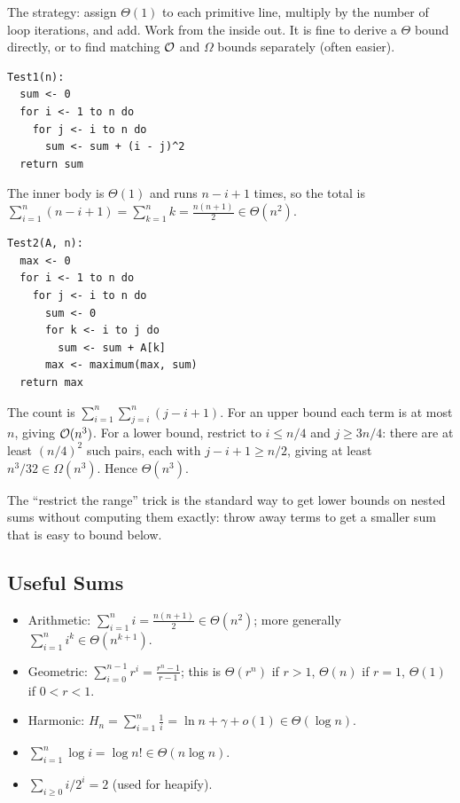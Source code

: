 The strategy: assign $\Theta(1)$ to each primitive line, multiply by the number
of loop iterations, and add. Work from the inside out. It is fine to derive a
$\Theta$ bound directly, or to find matching $\mathcal{O}$ and $\Omega$ bounds
separately (often easier).

\begin{lstlisting}
Test1(n):
  sum <- 0
  for i <- 1 to n do
    for j <- i to n do
      sum <- sum + (i - j)^2
  return sum
\end{lstlisting}

The inner body is $\Theta(1)$ and runs $n - i + 1$ times, so the total is
$\sum_{i=1}^{n} (n - i + 1) = \sum_{k=1}^{n} k = \frac{n(n+1)}{2} \in \Theta(n^2)$.

\begin{lstlisting}
Test2(A, n):
  max <- 0
  for i <- 1 to n do
    for j <- i to n do
      sum <- 0
      for k <- i to j do
        sum <- sum + A[k]
      max <- maximum(max, sum)
  return max
\end{lstlisting}

The count is $\sum_{i=1}^n \sum_{j=i}^n (j - i + 1)$. For an upper bound each
term is at most $n$, giving $\mathcal{O}(n^3)$. For a lower bound, restrict to
$i \le n/4$ and $j \ge 3n/4$: there are at least $(n/4)^2$ such pairs, each with
$j - i + 1 \ge n/2$, giving at least $n^3/32 \in \Omega(n^3)$. Hence $\Theta(n^3)$.

\begin{aside}
The ``restrict the range'' trick is the standard way to get lower bounds on
nested sums without computing them exactly: throw away terms to get a smaller
sum that is easy to bound below.
\end{aside}

\subsection{Useful Sums}

\begin{itemize}
  \item Arithmetic: $\sum_{i=1}^{n} i = \frac{n(n+1)}{2} \in \Theta(n^2)$;
        more generally $\sum_{i=1}^n i^k \in \Theta(n^{k+1})$.
  \item Geometric: $\sum_{i=0}^{n-1} r^i = \frac{r^n - 1}{r - 1}$; this is
        $\Theta(r^{n})$ if $r > 1$, $\Theta(n)$ if $r = 1$, $\Theta(1)$ if $0<r<1$.
  \item Harmonic: $H_n = \sum_{i=1}^{n} \frac1i = \ln n + \gamma + o(1) \in \Theta(\log n)$.
  \item $\sum_{i=1}^n \log i = \log n! \in \Theta(n \log n)$.
  \item $\sum_{i \ge 0} i/2^i = 2$ (used for heapify).
\end{itemize}

